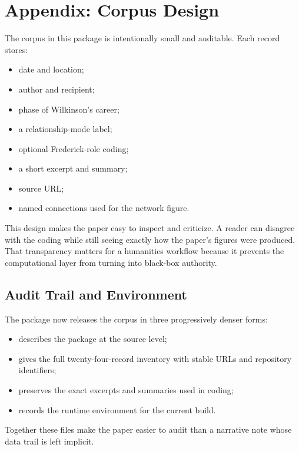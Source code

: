 \appendix
\section{Appendix: Corpus Design}

The corpus in this package is intentionally small and auditable. Each record stores:

\begin{itemize}[leftmargin=1.4em]
  \item date and location;
  \item author and recipient;
  \item phase of Wilkinson's career;
  \item a relationship-mode label;
  \item optional Frederick-role coding;
  \item a short excerpt and summary;
  \item source URL;
  \item named connections used for the network figure.
\end{itemize}

This design makes the paper easy to inspect and criticize. A reader can disagree with the coding while still seeing exactly how the paper's figures were produced. That transparency matters for a humanities workflow because it prevents the computational layer from turning into black-box authority.

\subsection*{Audit Trail and Environment}

The package now releases the corpus in three progressively denser forms:

\begin{itemize}[leftmargin=1.4em]
  \item {} describes the package at the source level;
  \item {} gives the full twenty-four-record inventory with stable URLs and repository identifiers;
  \item {} preserves the exact excerpts and summaries used in coding;
  \item {} records the runtime environment for the current build.
\end{itemize}

Together these files make the paper easier to audit than a narrative note whose data trail is left implicit.

